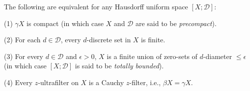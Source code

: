 The following are equivalent for any Hausdorff uniform space $[X; \mathcal{D}]$:

(1) $\gamma X$ is compact (in which case $X$ and $\mathcal{D}$ are said to be \textit{precompact}).

(2) For each $d \in \mathcal{D}$, every $d$-discrete set in $X$ is finite.

(3) For every $d \in \mathcal{D}$ and $\epsilon > 0$, $X$ is a finite union of zero-sets of $d$-diameter $\leq \epsilon$ (in which case $[X; \mathcal{D}]$ is said to be \textit{totally bounded}).

(4) Every $z$-ultrafilter on $X$ is a Cauchy $z$-filter, i.e., $\beta X = \gamma X$.
